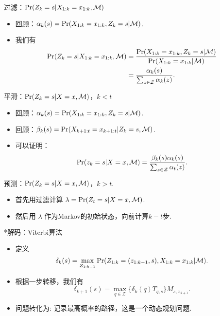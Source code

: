 {过滤：$\Pr(Z_k = s|X_{1:k}=x_{1:k}, \mathcal M)$}
\begin{itemize}
    \item 回顾：$\alpha_k(s)= \Pr(X_{1:k}=x_{1:k}, Z_k=s| \mathcal M)$. 
    \item 我们有
    \begin{align*}
        \Pr(Z_k = s|X_{1:k}=x_{1:k}, \mathcal M) & = \frac{\Pr(X_{1:k}=x_{1:k}, Z_k=s| \mathcal M)}{\Pr(X_{1:k}=x_{1:k}| \mathcal M)} \\
        &= \frac{\alpha_k(s)}{\sum_{z\in\mathcal Z}\alpha_k(z)}.
    \end{align*}
\end{itemize}


{平滑：$\Pr(Z_k = s|X=x, \mathcal M)$，$k < t$} 
\begin{itemize}
    \item 回顾：$\alpha_k(s)= \Pr(X_{1:k}=x_{1:k}, Z_k=s| \mathcal M)$.
    \item 回顾：$\beta_k(s)=\Pr(X_{k+1:t}=x_{k+1:t} |Z_k=s, \mathcal M)$.
    \item 可以证明：
        \[\Pr(z_k = s|X=x, \mathcal M)=\frac{\beta_k(s)\alpha_k(s)}{\sum_{z\in\mathcal Z}\alpha_t(z)}.
    \]%
\end{itemize}



{预测：$\Pr(Z_k = s|X=x, \mathcal M)$，$k > t$.}
\begin{itemize}
    \item 首先用过滤计算 $\lambda=\Pr(Z_t = s|X=x, \mathcal M)$.
    \item 然后用 $\lambda$ 作为Markov的初始状态，向前计算$k-t$步.
\end{itemize}


{*解码：Viterbi算法}
\begin{itemize}
    \item 定义 
    $$\delta_k(s) = \max_{Z_{1:k-1}}\Pr(Z_{1:k} = (z_{1:k-1}, s), X_{1:k}=x_{1:k}| \mathcal M).$$
    \item 根据一步转移，我们有
    $$\delta_{k+1}(s) = \max_{q\in \mathcal Z}\{\delta_k(q)T_{q,s}\}M_{s,x_{k+1}}.$$
    \item 问题转化为: 记录最高概率的路径，这是一个动态规划问题.
\end{itemize}


